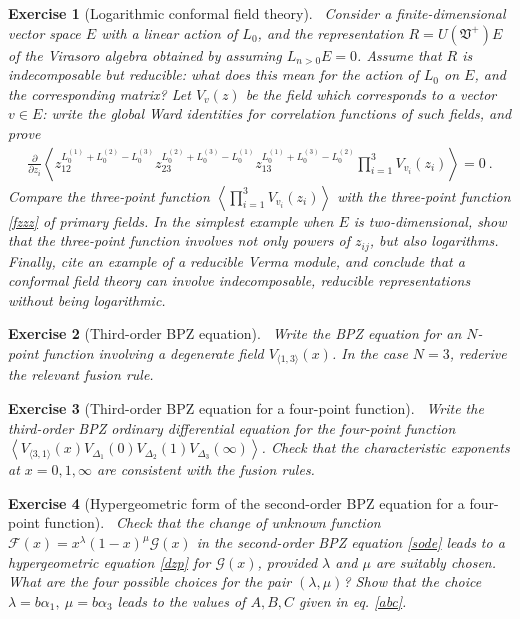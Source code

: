 \documentclass[12pt, a4paper, notitlepage, twoside]{report}
\numberwithin{equation}{section}
\theoremstyle{break}
\newtheorem{exo}{Exercise}[chapter]
\begin{document}
\begin{exo}[Logarithmic conformal field theory]
 ~\label{exolog}
Consider a finite-dimensional vector space $E$ with a linear action of $L_0$, and the representation $R=U(\mathfrak{V}^+)E$ of the Virasoro algebra obtained by assuming $L_{n>0}E=0$.
Assume that $R$ is indecomposable but reducible: what does this mean for the action of $L_0$ on $E$, and the corresponding matrix? Let $V_v(z)$ be the field which corresponds to a vector $v\in E$: write the global Ward identities for correlation functions of such fields, and prove 
\begin{align}
 {\frac{\partial}{\partial z_i}} \left\langle z_{12}^{L_0^{(1)}+L_0^{(2)}-L_0^{(3)}} z_{23}^{L_0^{(2)}+L_0^{(3)}-L_0^{(1)}} z_{13}^{L_0^{(1)}+L_0^{(3)}-L_0^{(2)}} \prod_{i=1}^3 V_{v_i}(z_i)\right\rangle = 0\ .
\end{align}
Compare the three-point function $\left\langle  \prod_{i=1}^3 V_{v_i}(z_i)\right\rangle$ with the three-point function \eqref{fzzz} of primary fields.
In the simplest example when $E$ is two-dimensional, show that the three-point function involves not only powers of $z_{ij}$, but also logarithms.
Finally, cite an example of a reducible Verma module, and conclude that 
a conformal field theory can involve indecomposable, reducible representations without being logarithmic. 
\end{exo}


\begin{exo}[Third-order BPZ equation]
 ~\label{exotob}
 Write the BPZ equation for an $N$-point function involving a degenerate field $V_{\langle 1,3 \rangle}(x)$.
In the case $N=3$, rederive the relevant fusion rule.
\end{exo}

\begin{exo}[Third-order BPZ equation for a four-point function]
 ~\label{exotbf}
 Write the third-order BPZ ordinary differential equation for the four-point function $\left\langle V_{\langle 3,1 \rangle}(x)V_{\Delta_1}(0)V_{\Delta_2}(1)V_{\Delta_3}(\infty)\right\rangle $.
Check that the characteristic exponents at $x=0,1,\infty$ are consistent with the fusion rules. 
\end{exo}


\begin{exo}[Hypergeometric form of the second-order BPZ equation for a four-point function]
 ~\label{exohge}
 Check that the change of unknown function $\mathcal{F}(x)=x^{\lambda}(1-x)^{\mu}\mathcal{G}(x)$ in the second-order BPZ equation \eqref{sode} leads to a hypergeometric equation \eqref{dzp} for $\mathcal{G}(x)$, provided $\lambda$ and $\mu$ are suitably chosen.
What are the four possible choices for the pair $(\lambda,\mu)$?
Show that the choice $\lambda=b\alpha_1,\ \mu=b\alpha_3$ leads to the values of $A,B,C$ given in eq. \eqref{abc}. 
\end{exo}
\end{document}
